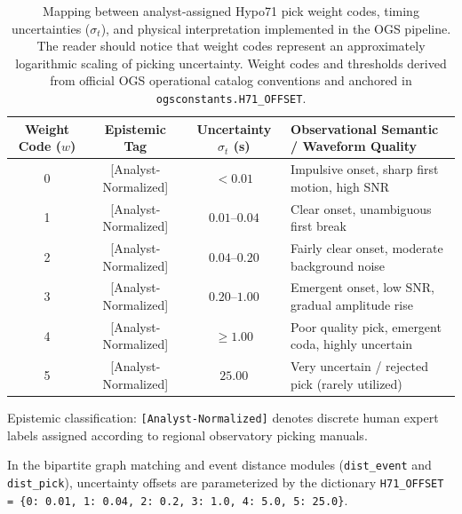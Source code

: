 \begin{table}[htbp]
  \centering
  \small
  \caption{Mapping between analyst-assigned Hypo71 pick weight codes, timing uncertainties ($\sigma_t$), and physical interpretation implemented in the OGS pipeline. The reader should notice that weight codes represent an approximately logarithmic scaling of picking uncertainty. Weight codes and thresholds derived from official OGS operational catalog conventions and anchored in \texttt{ogsconstants.H71\_OFFSET}.}
  \label{tab:h71_weights}
  \begin{threeparttable}
    \begin{tabularx}{\linewidth}{c c c X}
      \toprule
      \textbf{Weight Code ($w$)} & \textbf{Epistemic Tag\tnote{a}} & \textbf{Uncertainty $\sigma_t$ (\unit{\second})\tnote{b}} & \textbf{Observational Semantic / Waveform Quality} \\
      \midrule
      0 & [Analyst-Normalized] & $< 0.01$     & Impulsive onset, sharp first motion, high SNR \\
      1 & [Analyst-Normalized] & $0.01\text{--}0.04$ & Clear onset, unambiguous first break \\
      2 & [Analyst-Normalized] & $0.04\text{--}0.20$ & Fairly clear onset, moderate background noise \\
      3 & [Analyst-Normalized] & $0.20\text{--}1.00$ & Emergent onset, low SNR, gradual amplitude rise \\
      4 & [Analyst-Normalized] & $\ge 1.00$    & Poor quality pick, emergent coda, highly uncertain \\
      5 & [Analyst-Normalized] & $25.00$      & Very uncertain / rejected pick (rarely utilized) \\
      \bottomrule
    \end{tabularx}
    \begin{tablenotes}[flushleft]
      \footnotesize
      \item[a] Epistemic classification: \texttt{[Analyst-Normalized]} denotes discrete human expert labels assigned according to regional observatory picking manuals.
      \item[b] In the bipartite graph matching and event distance modules (\texttt{dist\_event} and \texttt{dist\_pick}), uncertainty offsets are parameterized by the dictionary \texttt{H71\_OFFSET = \{0: 0.01, 1: 0.04, 2: 0.2, 3: 1.0, 4: 5.0, 5: 25.0\}}.
    \end{tablenotes}
  \end{threeparttable}
\end{table}


